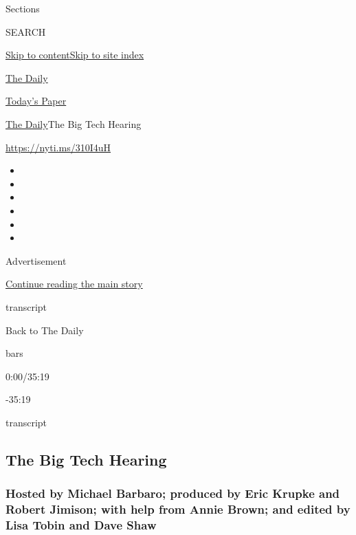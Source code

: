 Sections

SEARCH

\protect\hyperlink{site-content}{Skip to
content}\protect\hyperlink{site-index}{Skip to site index}

\href{https://www.nytimes3xbfgragh.onion/podcasts/the-daily}{The Daily}

\href{https://myaccount.nytimes3xbfgragh.onion/auth/login?response_type=cookie\&client_id=vi}{}

\href{https://www.nytimes3xbfgragh.onion/section/todayspaper}{Today's
Paper}

\href{/podcasts/the-daily}{The Daily}\textbar{}The Big Tech Hearing

\href{https://nyti.ms/310I4uH}{https://nyti.ms/310I4uH}

\begin{itemize}
\item
\item
\item
\item
\item
\item
\end{itemize}

Advertisement

\protect\hyperlink{after-top}{Continue reading the main story}

transcript

Back to The Daily

bars

0:00/35:19

-35:19

transcript

\hypertarget{the-big-tech-hearing}{%
\subsection{The Big Tech Hearing}\label{the-big-tech-hearing}}

\hypertarget{hosted-by-michael-barbaro-produced-by-eric-krupke-and-robert-jimison-with-help-from-annie-brown-and-edited-by-lisa-tobin-and-dave-shaw}{%
\subsubsection{Hosted by Michael Barbaro; produced by Eric Krupke and
Robert Jimison; with help from Annie Brown; and edited by Lisa Tobin and
Dave
Shaw}\label{hosted-by-michael-barbaro-produced-by-eric-krupke-and-robert-jimison-with-help-from-annie-brown-and-edited-by-lisa-tobin-and-dave-shaw}}

